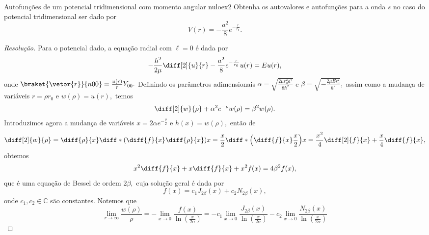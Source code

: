 \begin{exercício}{Autofunções de um potencial tridimensional com momento angular nulo}{ex2}
    Obtenha os autovalores e autofunções para a onda \(s\) no caso do potencial tridimensional ser dado por
    \begin{equation*}
        V(r) = -\frac{a^2}{8} e^{-\frac{r}{r_0}}.
    \end{equation*}
\end{exercício}
\begin{proof}[Resolução]
    Para o potencial dado, a equação radial com \(\ell = 0\) é dada por
    \begin{equation*}
        -\frac{\hbar^2}{2\mu} \diff[2]{u}{r} - \frac{a^2}{8} e^{-\frac{r}{r_0}}u(r) = E u(r),
    \end{equation*}
    onde \(\braket{\vetor{r}}{n00} = \frac{u(r)}{r} Y_{00}.\) Definindo os parâmetros adimensionais \(\alpha = \sqrt{\frac{2\mu r_0^2 a^2}{8 \hbar^2}}\) e \(\beta = \sqrt{-\frac{2\mu E r_0^2}{\hbar^2}},\) assim como a mudança de variáveis \(r = \rho r_0\) e \(w(\rho) = u(r),\) temos
    \begin{equation*}
        \diff[2]{w}{\rho} + \alpha^2 e^{-\rho} w(\rho) = \beta^2 w(\rho).
    \end{equation*}
    Introduzimos agora a mudança de variáveis \(x = 2 \alpha e^{-\frac{\rho}{2}}\) e \(h(x) = w(\rho),\) então de
    \begin{equation*}
        \diff[2]{w}{\rho} = \diff{\rho}{x}\diff*{\left(\diff{f}{x} \diff{\rho}{x}\right)}{x} = \frac{x}{2} \diff*{\left(\diff{f}{x} \frac{x}{2}\right)}{x} = \frac{x^2}{4}\diff[2]{f}{x} + \frac{x}{4} \diff{f}{x},
    \end{equation*}
    obtemos
    \begin{equation*}
        x^2 \diff{f}{x} + x \diff{f}{x} + x^2 f(x) = 4\beta^2 f(x),
    \end{equation*}
    que é uma equação de Bessel de ordem \(2 \beta,\) cuja solução geral é dada por
    \begin{equation*}
        f(x) = c_1 J_{2\beta}(x) + c_2 N_{2\beta}(x),
    \end{equation*}
    onde \(c_1, c_2 \in \mathbb{C}\) são constantes. Notemos que
    \begin{equation*}
        \lim_{r\to\infty}{\frac{w(\rho)}{\rho}} = -\lim_{x \to 0}{\frac{f(x)}{\ln\left(\frac{x}{2\alpha}\right)}} = 
        -c_1 \lim_{x\to0}{\frac{J_{2 \beta}(x)}{\ln\left(\frac{x}{2\alpha}\right)}} - c_2 \lim_{x\to0}{\frac{N_{2 \beta}(x)}{\ln\left(\frac{x}{2\alpha}\right)}}

\end{equation*}
\end{proof}
